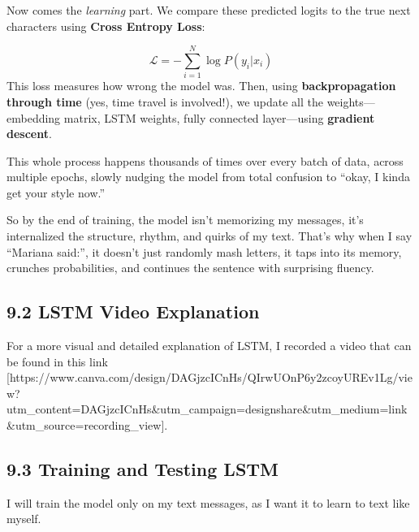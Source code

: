 \documentclass[11pt]{article}
\begin{document}
Now comes the \emph{learning} part. We compare these predicted logits to
the true next characters using \textbf{Cross Entropy Loss}:

\[
\mathcal{L} = -\sum_{i=1}^{N} \log P(y_i | x_i)
\] This loss measures how wrong the model was. Then, using
\textbf{backpropagation through time} (yes, time travel is involved!),
we update all the weights---embedding matrix, LSTM weights, fully
connected layer---using \textbf{gradient descent}.

This whole process happens thousands of times over every batch of data,
across multiple epochs, slowly nudging the model from total confusion to
``okay, I kinda get your style now.''

So by the end of training, the model isn't memorizing my messages, it's
internalized the structure, rhythm, and quirks of my text. That's why
when I say ``Mariana said:'', it doesn't just randomly mash letters, it
taps into its memory, crunches probabilities, and continues the sentence
with surprising fluency.

\subsection{9.2 LSTM Video Explanation}\label{lstm-video-explanation}

For a more visual and detailed explanation of LSTM, I recorded a video
that can be found in this link
{[}https://www.canva.com/design/DAGjzcICnHs/QIrwUOnP6y2zcoyUREv1Lg/view?utm\_content=DAGjzcICnHs\&utm\_campaign=designshare\&utm\_medium=link\&utm\_source=recording\_view{]}.

\subsection{9.3 Training and Testing
LSTM}\label{training-and-testing-lstm}

I will train the model only on my text messages, as I want it to learn
to text like myself.
\end{document}
